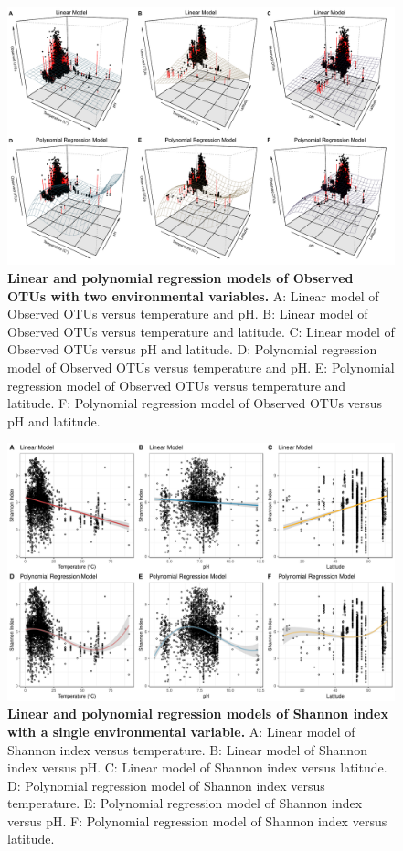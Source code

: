 \begin{figure}[H]
    \centering
    \includegraphics[scale=0.33]{./Figures/OO_LM_PM_all_2EVs_3D}
    \caption{\textbf{Linear and polynomial regression models of Observed OTUs with two environmental variables.} A: Linear model of Observed OTUs versus temperature and pH. B: Linear model of Observed OTUs versus temperature and latitude. C: Linear model of Observed OTUs versus pH and latitude. D: Polynomial regression model of Observed OTUs versus temperature and pH. E: Polynomial regression model of Observed OTUs versus temperature and latitude. F: Polynomial regression model of Observed OTUs versus pH and latitude.}
    \label{fig:OO_2EVs}
\end{figure}

\begin{figure}[H]
    \centering
    \includegraphics[scale=0.33]{./Figures/Shan_LM_PM_simpleTpL}
    \caption{\textbf{Linear and polynomial regression models of Shannon index with a single environmental variable.} A: Linear model of Shannon index versus temperature. B: Linear model of Shannon index versus pH. C: Linear model of Shannon index versus latitude. D: Polynomial regression model of Shannon index versus temperature. E: Polynomial regression model of Shannon index versus pH. F: Polynomial regression model of Shannon index versus latitude.}
    \label{fig:Shan_simpleTpL}
\end{figure}

